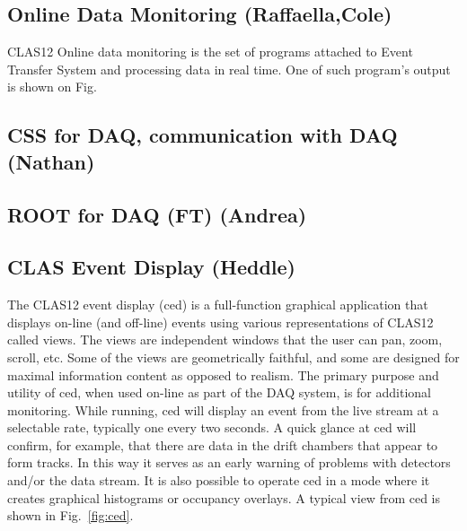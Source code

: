 \subsection{Online Data Monitoring (Raffaella,Cole)}

CLAS12 Online data monitoring is the set of programs attached to Event Transfer System and processing data in real time. One of such program's output is shown on Fig.



\subsection{CSS for DAQ, communication with DAQ (Nathan)}



\subsection{ROOT for DAQ (FT) (Andrea)}




\subsection{CLAS Event Display (Heddle)}

The CLAS12 event display (ced) is a full-function graphical application that displays on-line (and off-line) events using various representations of CLAS12 called views. The views are independent windows that the user can pan, zoom, scroll, etc. Some of the views are geometrically faithful, and some are designed for maximal information content as opposed to realism. The primary purpose and utility of ced, when used on-line as part of the DAQ system, is for additional monitoring. While running, ced will display an event from the live stream at a selectable rate, typically one every two seconds. A quick glance at ced will confirm, for example, that there are data in the drift chambers that appear to form tracks. In this way it serves as an early warning of problems with detectors and/or the data stream. It is also possible to operate ced in a mode where it creates graphical histograms or occupancy overlays. A typical view from ced is shown in Fig.~\ref{fig:ced}.

